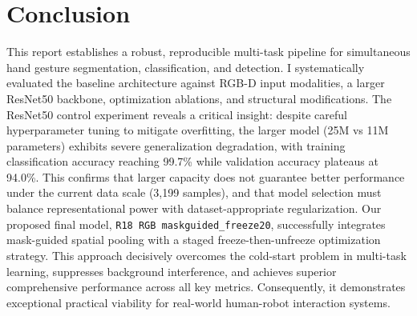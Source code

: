\documentclass[conference]{IEEEtran}
\begin{document}
\section{Conclusion}
This report establishes a robust, reproducible multi-task pipeline for simultaneous hand gesture segmentation, classification, and detection. I systematically evaluated the baseline architecture against RGB-D input modalities, a larger ResNet50 backbone, optimization ablations, and structural modifications. The ResNet50 control experiment reveals a critical insight: despite careful hyperparameter tuning to mitigate overfitting, the larger model (25M vs 11M parameters) exhibits severe generalization degradation, with training classification accuracy reaching 99.7\% while validation accuracy plateaus at 94.0\%. This confirms that larger capacity does not guarantee better performance under the current data scale (3,199 samples), and that model selection must balance representational power with dataset-appropriate regularization. Our proposed final model, \texttt{R18 RGB maskguided\_freeze20}, successfully integrates mask-guided spatial pooling with a staged freeze-then-unfreeze optimization strategy. This approach decisively overcomes the cold-start problem in multi-task learning, suppresses background interference, and achieves superior comprehensive performance across all key metrics. Consequently, it demonstrates exceptional practical viability for real-world human-robot interaction systems.



\end{document}
